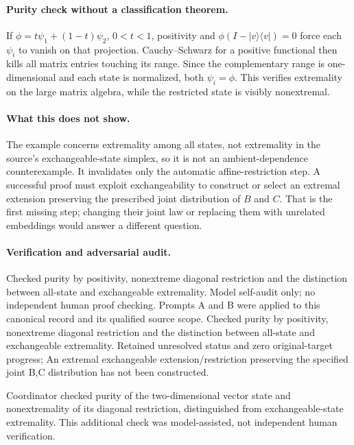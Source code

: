 \documentclass[11pt]{article}
\begin{document}
\paragraph{Purity check without a classification theorem.} If $\phi=t\psi_1+(1-t)\psi_2$, $0<t<1$, positivity and $\phi(I-|v\rangle\langle v|)=0$ force each $\psi_i$ to vanish on that projection. Cauchy--Schwarz for a positive functional then kills all matrix entries touching its range. Since the complementary range is one-dimensional and each state is normalized, both $\psi_i=\phi$. This verifies extremality on the large matrix algebra, while the restricted state is visibly nonextremal.

\paragraph{What this does not show.} The example concerns extremality among all states, not extremality in the source's exchangeable-state simplex, so it is not an ambient-dependence counterexample. It invalidates only the automatic affine-restriction step. A successful proof must exploit exchangeability to construct or select an extremal extension preserving the prescribed joint distribution of $B$ and $C$. That is the first missing step; changing their joint law or replacing them with unrelated embeddings would answer a different question.

\paragraph{Verification and adversarial audit.}
Checked purity by positivity, nonextreme diagonal restriction and the distinction between all-state and exchangeable extremality. Model self-audit only; no independent human proof checking. Prompts A and B were applied to this canonical record and its qualified source scope. Checked purity by positivity, nonextreme diagonal restriction and the distinction between all-state and exchangeable extremality. Retained unresolved status and zero original-target progress; An extremal exchangeable extension/restriction preserving the specified joint B,C distribution has not been constructed.

Coordinator checked purity of the two-dimensional vector state and nonextremality of its diagonal restriction, distinguished from exchangeable-state extremality. This additional check was model-assisted, not independent human verification.
\end{document}
